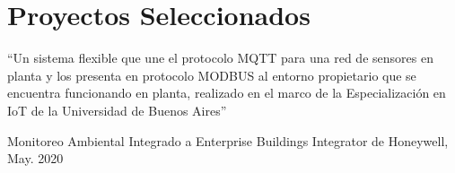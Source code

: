 \section{Proyectos Seleccionados}

\newcommand{\pub}[5]{
	\parbox[t][][t]{\linewidth}{%
		\begin{small}
		\parbox{\linewidth}{{``#4''}}
		\smallbreak
		\parbox{\linewidth}{{#2}, {#1}}
		\parbox{\linewidth}{{\href{https://doi.org/#3}{#3}}}
		\end{small}
	}
	\bigbreak
	\smallskip
}

\pub{May. 2020}{Monitoreo Ambiental Integrado a Enterprise Buildings Integrator de Honeywell}{}{Un sistema flexible que une el protocolo MQTT para una red de sensores en planta y los presenta en protocolo MODBUS al entorno propietario que se encuentra funcionando en planta, realizado en el marco de la Especialización en IoT de la Universidad de Buenos Aires}{
}


